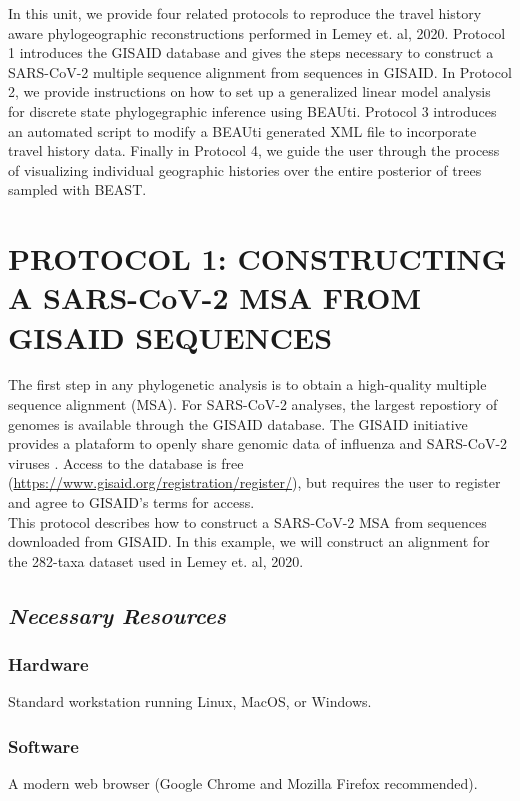 \documentclass{article}
\begin{document}
In this unit, we provide four related protocols to reproduce the travel history aware phylogeographic reconstructions performed in Lemey et. al, 2020. Protocol 1 introduces the GISAID database and gives the steps necessary to construct a SARS-CoV-2 multiple sequence alignment from sequences in GISAID. In Protocol 2, we provide instructions on how to set up a generalized linear model analysis for discrete state phylogegraphic inference using BEAUti. Protocol 3 introduces an automated script to modify a BEAUti generated XML file to incorporate travel history data. Finally in Protocol 4, we guide the user through the process of visualizing individual geographic histories over the entire posterior of trees sampled with BEAST.

\section*{PROTOCOL 1: CONSTRUCTING A SARS-CoV-2 MSA FROM GISAID SEQUENCES}

The first step in any phylogenetic analysis is to obtain a high-quality multiple sequence alignment (MSA). For SARS-CoV-2 analyses, the largest repostiory of genomes is available through the GISAID database. The GISAID initiative provides a plataform to openly share genomic data of influenza and SARS-CoV-2 viruses \cite{gisaid}. Access to the database is free (\url{https://www.gisaid.org/registration/register/}), but requires the user to register and agree to GISAID's terms for access.\\

This protocol describes how to construct a SARS-CoV-2 MSA from sequences downloaded from GISAID. In this example, we will construct an alignment for the 282-taxa dataset used in Lemey et. al, 2020.

\subsection*{\textbf{\textit{Necessary Resources}}}
\subsubsection*{Hardware}
\hspace{0.5cm}Standard workstation running Linux, MacOS, or Windows. 

\subsubsection*{Software}
\hspace{0.5cm}A modern web browser (Google Chrome and Mozilla Firefox recommended).
\end{document}
